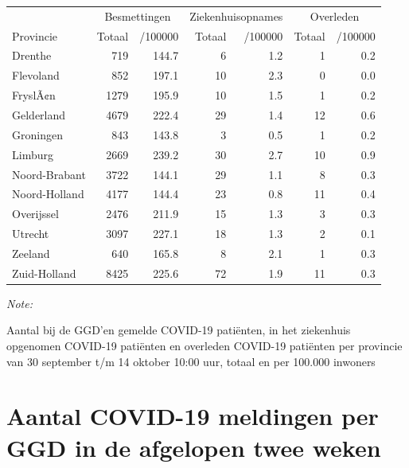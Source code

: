 \documentclass[
  english,
  man,floatsintext]{apa6}
\begin{document}
\begin{table}
\centering
\begin{threeparttable}
\begin{tabular}{lrrrrrr}
\toprule
\multicolumn{1}{c}{ } & \multicolumn{2}{c}{Besmettingen} & \multicolumn{2}{c}{Ziekenhuisopnames} & \multicolumn{2}{c}{Overleden} \\
\cmidrule(l{3pt}r{3pt}){2-3} \cmidrule(l{3pt}r{3pt}){4-5} \cmidrule(l{3pt}r{3pt}){6-7}
Provincie & Totaal & /100000 & Totaal & /100000 & Totaal & /100000\\
\midrule
Drenthe & 719 & 144.7 & 6 & 1.2 & 1 & 0.2\\
Flevoland & 852 & 197.1 & 10 & 2.3 & 0 & 0.0\\
FryslÃ¢n & 1279 & 195.9 & 10 & 1.5 & 1 & 0.2\\
Gelderland & 4679 & 222.4 & 29 & 1.4 & 12 & 0.6\\
Groningen & 843 & 143.8 & 3 & 0.5 & 1 & 0.2\\
Limburg & 2669 & 239.2 & 30 & 2.7 & 10 & 0.9\\
Noord-Brabant & 3722 & 144.1 & 29 & 1.1 & 8 & 0.3\\
Noord-Holland & 4177 & 144.4 & 23 & 0.8 & 11 & 0.4\\
Overijssel & 2476 & 211.9 & 15 & 1.3 & 3 & 0.3\\
Utrecht & 3097 & 227.1 & 18 & 1.3 & 2 & 0.1\\
Zeeland & 640 & 165.8 & 8 & 2.1 & 1 & 0.3\\
Zuid-Holland & 8425 & 225.6 & 72 & 1.9 & 11 & 0.3\\
\bottomrule
\end{tabular}
\begin{tablenotes}
\item \textit{Note: } 
\item Aantal bij de GGD’en gemelde COVID-19 patiënten, in het ziekenhuis opgenomen COVID-19 patiënten en overleden COVID-19 patiënten per provincie van 30 september t/m 14 oktober 10:00 uur, totaal en per 100.000 inwoners
\end{tablenotes}
\end{threeparttable}
\end{table}

\newpage

\hypertarget{aantal-covid-19-meldingen-per-ggd-in-de-afgelopen-twee-weken}{%
\section{Aantal COVID-19 meldingen per GGD in de afgelopen twee weken}\label{aantal-covid-19-meldingen-per-ggd-in-de-afgelopen-twee-weken}}
\end{document}
